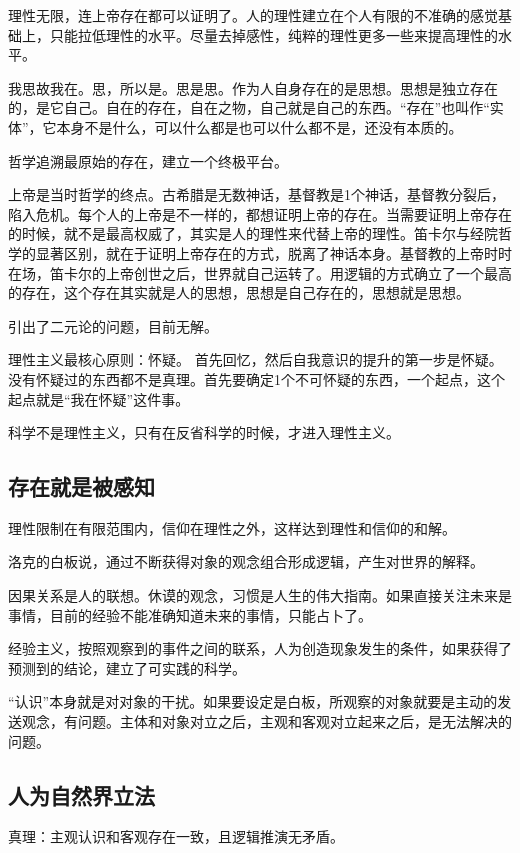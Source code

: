 理性无限，连上帝存在都可以证明了。人的理性建立在个人有限的不准确的感觉基础上，只能拉低理性的水平。尽量去掉感性，纯粹的理性更多一些来提高理性的水平。

我思故我在。思，所以是。思是思。作为人自身存在的是思想。思想是独立存在的，是它自己。自在的存在，自在之物，自己就是自己的东西。“存在”也叫作“实体”，它本身不是什么，可以什么都是也可以什么都不是，还没有本质的。

哲学追溯最原始的存在，建立一个终极平台。

上帝是当时哲学的终点。古希腊是无数神话，基督教是1个神话，基督教分裂后，陷入危机。每个人的上帝是不一样的，都想证明上帝的存在。当需要证明上帝存在的时候，就不是最高权威了，其实是人的理性来代替上帝的理性。笛卡尔与经院哲学的显著区别，就在于证明上帝存在的方式，脱离了神话本身。基督教的上帝时时在场，笛卡尔的上帝创世之后，世界就自己运转了。用逻辑的方式确立了一个最高的存在，这个存在其实就是人的思想，思想是自己存在的，思想就是思想。

引出了二元论的问题，目前无解。

理性主义最核心原则：怀疑。
首先回忆，然后自我意识的提升的第一步是怀疑。没有怀疑过的东西都不是真理。首先要确定1个不可怀疑的东西，一个起点，这个起点就是“我在怀疑”这件事。

科学不是理性主义，只有在反省科学的时候，才进入理性主义。

\subsection{存在就是被感知}

理性限制在有限范围内，信仰在理性之外，这样达到理性和信仰的和解。

洛克的白板说，通过不断获得对象的观念组合形成逻辑，产生对世界的解释。

因果关系是人的联想。休谟的观念，习惯是人生的伟大指南。如果直接关注未来是事情，目前的经验不能准确知道未来的事情，只能占卜了。

经验主义，按照观察到的事件之间的联系，人为创造现象发生的条件，如果获得了预测到的结论，建立了可实践的科学。

“认识”本身就是对对象的干扰。如果要设定是白板，所观察的对象就要是主动的发送观念，有问题。主体和对象对立之后，主观和客观对立起来之后，是无法解决的问题。

\subsection{人为自然界立法}



真理：主观认识和客观存在一致，且逻辑推演无矛盾。

